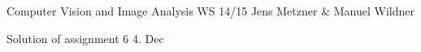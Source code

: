 \documentclass[10pt,a4paper]{scrartcl}
\begin{document}
\uebkopfzeile
  {Computer Vision and Image Analysis} %
  {WS 14/15}  %
  {}    %
  {Jens Metzner \& Manuel Wildner}    %

\uebtitel
{Solution of assignment 6} %
{4. Dec} %




\end{document}
